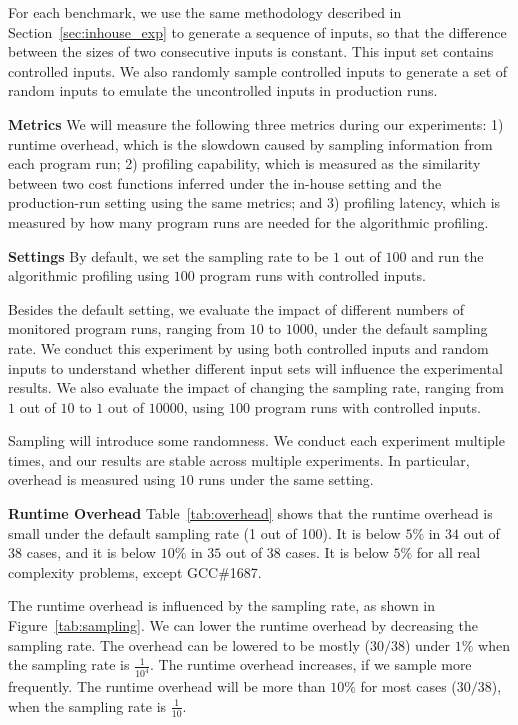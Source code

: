 For each benchmark, 
we use the same methodology described in Section~\ref{sec:inhouse_exp} 
to generate a sequence of inputs, 
so that the difference between the sizes of two consecutive inputs is constant.
This input set contains controlled inputs.
We also randomly sample controlled inputs to generate a set of random 
inputs to emulate the uncontrolled inputs in production runs.    

\noindent\textbf{Metrics}
We will measure the following three metrics during our experiments:
1) runtime overhead, which is the slowdown caused 
by sampling information from each program run;
2) profiling capability, which is measured as the similarity between two cost functions 
inferred under the in-house setting and the production-run setting using the same metrics;
and 3) profiling latency, which is measured by how many program 
runs are needed for the algorithmic profiling. 






\noindent\textbf{Settings}
By default, we set the sampling rate to be $1$ out of $100$ 
and run the algorithmic profiling using $100$ program runs with controlled inputs.  

Besides the default setting,
we evaluate the impact of different numbers of monitored program runs, 
ranging from $10$ to $1000$, under the default sampling rate.
We conduct this experiment by using both controlled inputs and random inputs 
to understand whether different input sets will influence the experimental results.
We also evaluate the impact of changing the sampling rate, ranging from $1$ out of $10$ to $1$ out of $10000$, 
using $100$ program runs with controlled inputs.  

Sampling will introduce some randomness. 
We conduct each experiment multiple times, 
and our results are stable across multiple experiments. 
In particular, overhead is measured using $10$ runs under the same setting. 

\noindent\textbf{Runtime Overhead}
Table~\ref{tab:overhead} shows that the runtime overhead is small under the 
default sampling rate (1 out of 100).
It is below $5\%$ in $34$ out of $38$ cases, 
and it is below $10\%$ in $35$ out of $38$ cases. 
It is below $5\%$ for all real complexity problems, 
except GCC\#1687. 

The runtime overhead is influenced by the sampling rate, 
as shown in Figure~\ref{tab:sampling}.
We can lower the runtime overhead by decreasing the sampling rate.
The overhead can be lowered to be mostly ($30/38$) 
under $1\%$ when the sampling rate is $\frac{1}{10^4}$.
The runtime overhead increases, 
if we sample more frequently.
The runtime overhead will be more than $10\%$ for most cases ($30/38$), 
when the sampling rate is $\frac{1}{10}$.

